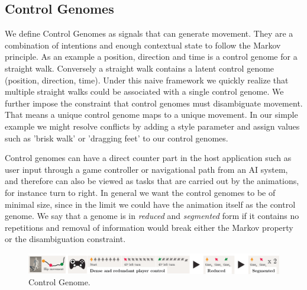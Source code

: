 \subsection{Control Genomes}
We define Control Genomes as signals that can generate movement. They are a combination of intentions and enough contextual state to follow the Markov principle. As an example a position, direction and time is a control genome for a straight walk. Conversely a straight walk contains a latent control genome (position, direction, time). Under this naive framework we quickly realize that multiple straight walks could be associated with a single control genome. We further impose the constraint that control genomes must disambiguate movement. That means a unique control genome maps to a unique movement. In our simple example we might resolve conflicts by adding a style parameter and assign values such as 'brisk walk' or 'dragging feet' to our control genomes. 

Control genomes can have a direct counter part in the host application such as user input through a game controller or navigational path from an AI system, and therefore can also be viewed as tasks that are carried out by the animations, for instance turn to right. In general we want the control genomes to be of minimal size, since in the limit we could have the animation itself as the control genome. We say that a genome is in \textit{reduced} and \textit{segmented} form if it contains no repetitions and removal of information would break either the Markov property or the disambiguation constraint. 

\begin{figure}
    \centering
        \includegraphics[width=1\columnwidth]{img/controlgenome.png}
    \caption{Control Genome.}
    \label{fig:control:genome}
\end{figure}

